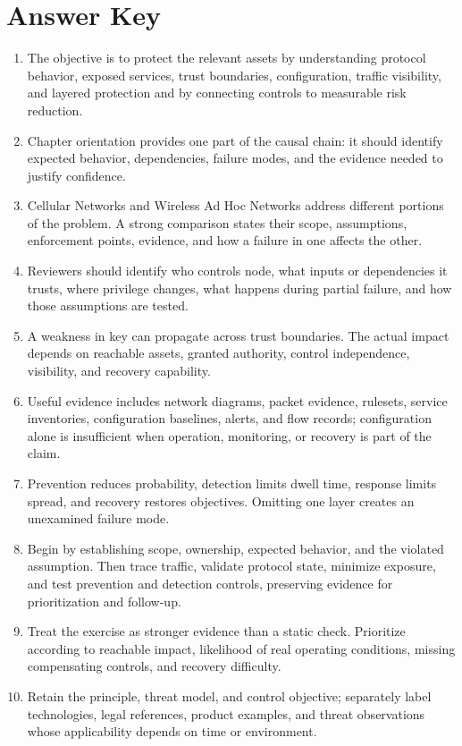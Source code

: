 \documentclass[11pt]{article}
\begin{document}
\section*{Answer Key}
\begin{enumerate}
\item The objective is to protect the relevant assets by understanding protocol behavior, exposed services, trust boundaries, configuration, traffic visibility, and layered protection and by connecting controls to measurable risk reduction.
\item Chapter orientation provides one part of the causal chain: it should identify expected behavior, dependencies, failure modes, and the evidence needed to justify confidence.
\item Cellular Networks and Wireless Ad Hoc Networks address different portions of the problem. A strong comparison states their scope, assumptions, enforcement points, evidence, and how a failure in one affects the other.
\item Reviewers should identify who controls node, what inputs or dependencies it trusts, where privilege changes, what happens during partial failure, and how those assumptions are tested.
\item A weakness in key can propagate across trust boundaries. The actual impact depends on reachable assets, granted authority, control independence, visibility, and recovery capability.
\item Useful evidence includes network diagrams, packet evidence, rulesets, service inventories, configuration baselines, alerts, and flow records; configuration alone is insufficient when operation, monitoring, or recovery is part of the claim.
\item Prevention reduces probability, detection limits dwell time, response limits spread, and recovery restores objectives. Omitting one layer creates an unexamined failure mode.
\item Begin by establishing scope, ownership, expected behavior, and the violated assumption. Then trace traffic, validate protocol state, minimize exposure, and test prevention and detection controls, preserving evidence for prioritization and follow-up.
\item Treat the exercise as stronger evidence than a static check. Prioritize according to reachable impact, likelihood of real operating conditions, missing compensating controls, and recovery difficulty.
\item Retain the principle, threat model, and control objective; separately label technologies, legal references, product examples, and threat observations whose applicability depends on time or environment.
\end{enumerate}
\end{document}
